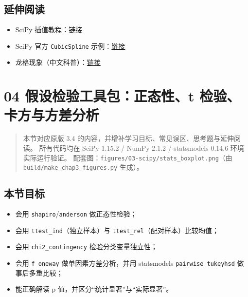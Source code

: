\subsection{延伸阅读}\label{ux5ef6ux4f38ux9605ux8bfb-12}

\begin{itemize}
\tightlist
\item
  SciPy
  插值教程：\href{https://docs.scipy.org/doc/scipy/tutorial/interpolate.html}{链接}
\item
  SciPy 官方 \texttt{CubicSpline}
  示例：\href{https://docs.scipy.org/doc/scipy/reference/generated/scipy.interpolate.CubicSpline.html}{链接}
\item
  龙格现象（中文科普）：\href{https://zh.wikipedia.org/wiki/\%E9\%BE\%99\%E6\%A0\%BC\%E7\%8E\%B0\%E8\%B1\%A1}{链接}
\end{itemize}

\section{04 假设检验工具包：正态性、t
检验、卡方与方差分析}\label{ux5047ux8bbeux68c0ux9a8cux5de5ux5177ux5305ux6b63ux6001ux6027t-ux68c0ux9a8cux5361ux65b9ux4e0eux65b9ux5deeux5206ux6790}

\begin{quote}
本节对应原版 3.4 的内容，并增补学习目标、常见误区、思考题与延伸阅读。
所有代码均在 SciPy 1.15.2 / NumPy 2.1.2 / statsmodels 0.14.6
环境实际运行验证。
配套图：\texttt{figures/03-scipy/stats\_boxplot.png}（由
\texttt{build/make\_chap3\_figures.py} 生成）。
\end{quote}

\subsection{本节目标}\label{ux672cux8282ux76eeux6807-16}

\begin{itemize}
\tightlist
\item
  会用 \texttt{shapiro}/\texttt{anderson} 做正态性检验；
\item
  会用 \texttt{ttest\_ind}（独立样本）与
  \texttt{ttest\_rel}（配对样本）比较均值；
\item
  会用 \texttt{chi2\_contingency} 检验分类变量独立性；
\item
  会用 \texttt{f\_oneway} 做单因素方差分析，并用 statsmodels
  \texttt{pairwise\_tukeyhsd} 做事后多重比较；
\item
  能正确解读 p 值，并区分``统计显著''与``实际显著''。
\end{itemize}

